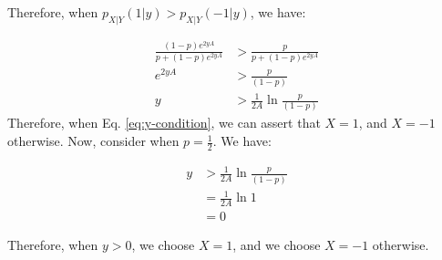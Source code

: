 \documentclass[journal,12pt,twocolumn]{IEEEtran}
\renewcommand\thesection{\arabic{section}}
\begin{document}
\begin{enumerate}[label=\thesection.\arabic*
    ,ref=\thesection.\theenumi]
Therefore, when $ p_{X|Y}(1|y) >  p_{X|Y}(-1|y)$, we have:


\begin{align}
    \frac{\left(1-p\right) e^{2yA}}{p + \left(1-p\right) e^{2yA}} &> \frac{p}{p + \left(1-p\right) e^{2yA}} \\
    e^{2yA} &> \frac{p}{\left(1-p\right)} \\
    \label{eq:y-condition}
    y &> \frac{1}{2A} \ln{\frac{p}{\left(1-p\right)}}
\end{align}
Therefore, when Eq. \eqref{eq:y-condition}, we can assert that $X = 1$, and $X = -1$ otherwise.
Now, consider when $p = \frac{1}{2} $.
We have:

\begin{align}
    y &> \frac{1}{2A} \ln{\frac{p}{\left(1-p\right)}} \\
    &= \frac{1}{2A} \ln{1} \\
    &= 0
\end{align}

Therefore, when $y > 0$, we choose $X = 1$, and we choose $X = -1$ otherwise.

\end{enumerate}
\end{document}
